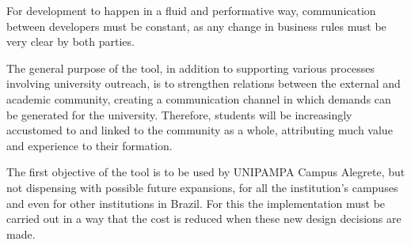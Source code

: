 For development to happen in a fluid and performative way, communication between developers must be constant, as any change in business rules must be very clear by both parties.


The general purpose of the tool, in addition to supporting various processes involving university outreach, is to strengthen relations between the external and academic community, creating a communication channel in which demands can be generated for the university.
Therefore, students will be increasingly accustomed to and linked to the community as a whole, attributing much value and experience to their formation.


The first objective of the tool is to be used by \ac{UNIPAMPA} Campus Alegrete, but not dispensing with possible future expansions, for all the institution's campuses and even for other institutions in Brazil.
For this the implementation must be carried out in a way that the cost is reduced when these new design decisions are made.

